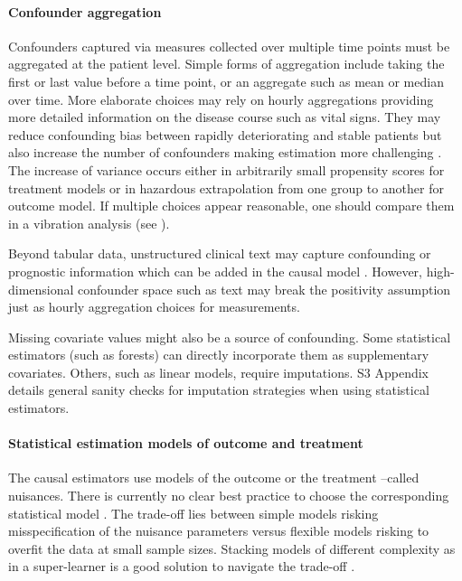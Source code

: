 \documentclass[10pt,letterpaper]{article}
\begin{document}
\paragraph{Confounder aggregation}
Confounders captured via measures collected over multiple time points must be
aggregated at the patient level. Simple forms of aggregation include taking the
first or last value before a time point, or an aggregate such as mean or median
over time. More elaborate choices may rely on hourly aggregations providing more
detailed information on the disease course such as vital signs. They may reduce
confounding bias between rapidly deteriorating and stable patients but also
increase the number of confounders making estimation more challenging
\cite{damour2020overlap}. The increase of variance occurs either in
arbitrarily small propensity scores for treatment models or in hazardous
extrapolation from one group to another for outcome model. If multiple
choices appear reasonable, one should compare them in a vibration analysis
(see ).

Beyond tabular data, unstructured clinical text may capture confounding or
prognostic information \cite{horng2017creating,jiang2023health} which can be
added in the causal model \cite{zeng2022uncovering}.
However, high-dimensional
confounder space such as text may break the positivity assumption just as hourly
aggregation choices for measurements.

Missing covariate values might also be a source of confounding. Some statistical
estimators (such as forests) can directly incorporate them as supplementary
covariates. Others, such as linear models, require imputations.
S3 Appendix details general sanity checks for
imputation strategies when using statistical estimators.

\paragraph{Statistical estimation models of outcome and treatment}

The causal estimators use models of the outcome or the treatment --called
nuisances. There is currently no clear best practice to choose the corresponding
statistical model \cite{wendling2018comparing, dorie2019automated}. The
trade-off lies between simple models risking misspecification of the nuisance
parameters versus flexible models risking to overfit the data at small sample
sizes. Stacking models of different complexity as in a super-learner is a good
solution to navigate the trade-off \cite{van2007super,doutreligne2023select}.
\end{document}
